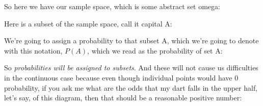 \documentclass[pdftex, brazil, 12pt, twoside]{article}
\begin{document}
So here we have our sample space, which is some
abstract set omega:

\begin{figure}[H]
  \begin{center}
  \end{center}
\end{figure}

Here is a subset of the sample space, call it capital A:

\begin{figure}[H]
  \begin{center}
  \end{center}
\end{figure}

We're going to assign a probability to
that subset A, which we're going to denote with this
notation, $P(A)$, which we read as the probability of set A:

\begin{figure}[H]
  \begin{center}
  \end{center}
\end{figure}

So
\emph{probabilities will be assigned to subsets}.
And these will not cause us difficulties in the continuous
case because even though individual points would have 0
probability, if you ask me what are the odds that my dart
falls in the upper half, let's say, of this diagram, then
that should be a reasonable positive number:
\end{document}
